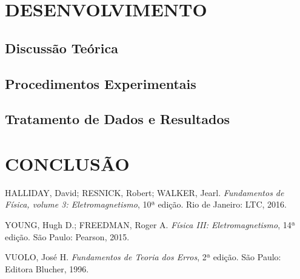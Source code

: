 \documentclass[a4paper,12pt]{article}
\begin{document}
\lipsum[1-3]

\newpage
\section{DESENVOLVIMENTO}
\label{sec:desenvolvimento}

\lipsum[1]

\subsection{Discussão Teórica}
\label{subsec:discussao_teorica}

\lipsum[1-3]

\subsection{Procedimentos Experimentais}
\label{subsec:procedimentos_experimentais}

\lipsum[1-2]

\subsection{Tratamento de Dados e Resultados}
\label{subsec:discussao_teorica}

\lipsum[1-2]

\newpage
\section{CONCLUSÃO}
\label{sec:conclusao}

\lipsum[1-2]


\newpage
{}  %

\begin{thebibliography}{99}

HALLIDAY, David; RESNICK, Robert; WALKER, Jearl. 
\textit{Fundamentos de Física, volume 3: Eletromagnetismo}, 10ª edição. 
Rio de Janeiro: LTC, 2016.

YOUNG, Hugh D.; FREEDMAN, Roger A. 
\textit{Física III: Eletromagnetismo}, 14ª edição. 
São Paulo: Pearson, 2015.

VUOLO, José H. 
\textit{Fundamentos de Teoria dos Erros}, 2ª edição.
São Paulo: Editora Blucher, 1996.

\end{thebibliography}
\end{document}
